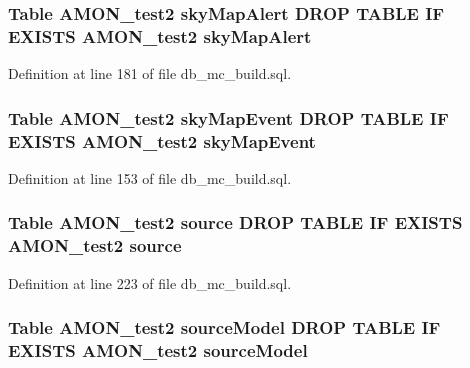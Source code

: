 \hypertarget{db__mc__build_8sql_a0c1193a567dbface05c887b539ec4e3f}{
\subsubsection[{sky\-Map\-Alert}]{\setlength{\rightskip}{0pt plus 5cm}Table {\bf A\-M\-O\-N\-\_\-test2} sky\-Map\-Alert D\-R\-O\-P T\-A\-B\-L\-E I\-F E\-X\-I\-S\-T\-S {\bf A\-M\-O\-N\-\_\-test2} sky\-Map\-Alert}}\label{db__mc__build_8sql_a0c1193a567dbface05c887b539ec4e3f}


Definition at line 181 of file db\-\_\-mc\-\_\-build.\-sql.

\hypertarget{db__mc__build_8sql_acdb25ebea89bf6ef9016d7392475b866}{
\subsubsection[{sky\-Map\-Event}]{\setlength{\rightskip}{0pt plus 5cm}Table {\bf A\-M\-O\-N\-\_\-test2} sky\-Map\-Event D\-R\-O\-P T\-A\-B\-L\-E I\-F E\-X\-I\-S\-T\-S {\bf A\-M\-O\-N\-\_\-test2} sky\-Map\-Event}}\label{db__mc__build_8sql_acdb25ebea89bf6ef9016d7392475b866}


Definition at line 153 of file db\-\_\-mc\-\_\-build.\-sql.

\hypertarget{db__mc__build_8sql_a1cdff1a87485f24f4a68e1c6d818073a}{
\subsubsection[{source}]{\setlength{\rightskip}{0pt plus 5cm}Table {\bf A\-M\-O\-N\-\_\-test2} source D\-R\-O\-P T\-A\-B\-L\-E I\-F E\-X\-I\-S\-T\-S {\bf A\-M\-O\-N\-\_\-test2} source}}\label{db__mc__build_8sql_a1cdff1a87485f24f4a68e1c6d818073a}


Definition at line 223 of file db\-\_\-mc\-\_\-build.\-sql.

\hypertarget{db__mc__build_8sql_a3f991a19d9b7954f6e45a0ee120ae12e}{
\subsubsection[{source\-Model}]{\setlength{\rightskip}{0pt plus 5cm}Table {\bf A\-M\-O\-N\-\_\-test2} source\-Model D\-R\-O\-P T\-A\-B\-L\-E I\-F E\-X\-I\-S\-T\-S {\bf A\-M\-O\-N\-\_\-test2} source\-Model}}\label{db__mc__build_8sql_a3f991a19d9b7954f6e45a0ee120ae12e}


